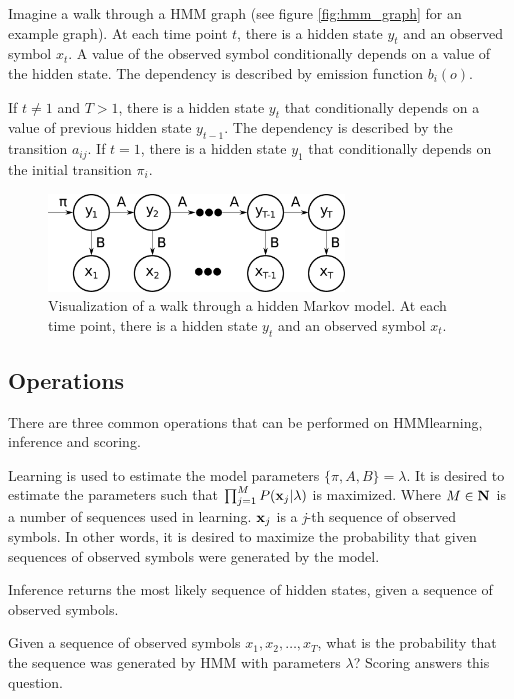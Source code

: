 \documentclass[thesis=B,english]{FITthesis}[2012/06/26]
\begin{document}
Imagine a walk through a HMM graph (see figure \ref{fig:hmm_graph} for an example graph). At each time point $t$, there is a hidden state $y_t$ and an observed symbol $x_t$. A value of the observed symbol conditionally depends on a value of the hidden state. The dependency is described by emission function $b_i(o)$.

If $t \neq 1$ and $T > 1$, there is a hidden state $y_t$ that conditionally depends on a value of previous hidden state $y_{t-1}$. The dependency is described by the transition $a_{ij}$. If $t = 1$, there is a hidden state $y_1$ that conditionally depends on the initial transition $\pi_i$.

\begin{figure}
	\centering
 	\includegraphics[width=0.7\textwidth]{hmm}
 	\caption{Visualization of a walk through a hidden Markov model. At each time point, there is a hidden state $y_t$ and an observed symbol $x_t$.}
 	\label{fig:hmm}
\end{figure}

\subsection{Operations}

There are three common operations that can be performed on HMM\textemdash learning, inference and scoring.

Learning is used to estimate the model parameters $\{\pi, A, B\} = \lambda$. It is desired to estimate the parameters such that $\prod_{j=1}^{M} P(\textbf x_j | \lambda )$ is maximized. Where $M \in \textbf N$ is a number of sequences used in learning. $\textbf x_j$ is a \emph{j}-th sequence of observed symbols. In other words, it is desired to maximize the probability that given sequences of observed symbols were generated by the model.

Inference returns the most likely sequence of hidden states, given a sequence of observed symbols.

Given a sequence of observed symbols $x_1, x_2, \dots, x_T$, what is the probability that the sequence was generated by HMM with parameters $\lambda$? Scoring answers this question.
\end{document}
